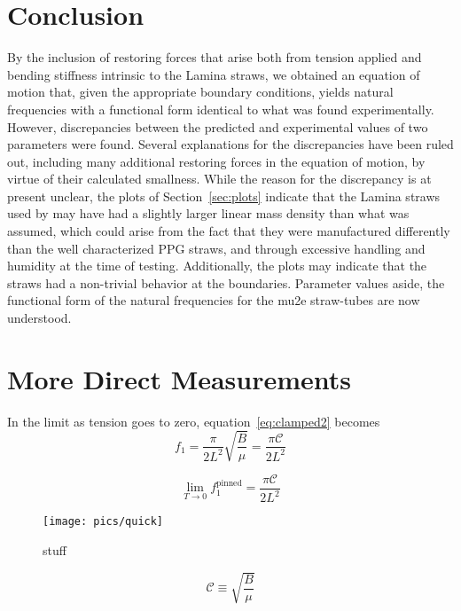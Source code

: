 \documentclass[twoside]{article}
\begin{document}
\begin{multicols}{2}
\section{Conclusion}
By the inclusion of restoring forces that arise both from tension applied and bending stiffness intrinsic to the Lamina straws, we obtained an equation of motion that, given the appropriate boundary conditions, yields natural frequencies with a functional form identical to what was found experimentally. However, discrepancies between the predicted and experimental values of two parameters were found.  Several explanations for the discrepancies have been ruled out, including many additional restoring forces in the equation of motion, by virtue of their calculated smallness. While the reason for the discrepancy is at present unclear, the plots of Section~\ref{sec:plots} indicate that the Lamina straws used by\cite{david} may have had a slightly larger linear mass density than what was assumed, which could arise from the fact that they were manufactured differently than the well characterized PPG straws, and through excessive handling and humidity at the time of testing. Additionally, the plots may indicate that the straws had a non-trivial behavior at the boundaries. Parameter values aside, the functional form of the natural frequencies for the mu2e straw-tubes are now understood.




\section{More Direct Measurements}
In the limit as tension goes to zero, equation~\ref{eq:clamped2} becomes
\begin{equation}
f_1 =  \frac{\pi}{2L^2}\sqrt{\frac{B}{\mu}} = \frac{\pi\mathcal{C}}{2L^2}
\end{equation}

\begin{equation}
\lim_{T\to0} f^{\text{pinned}}_1 = \frac{\pi\mathcal{C}}{2L^2}
\end{equation}


\begin{figure}[H]
	\texttt{[image: pics/quick]}
	\caption{stuff
	}
	\label{fig:quick}
\end{figure}


\begin{equation}
\mathcal{C} \equiv \sqrt{\frac{B}{\mu}}
\end{equation}



\end{multicols}
\end{document}
